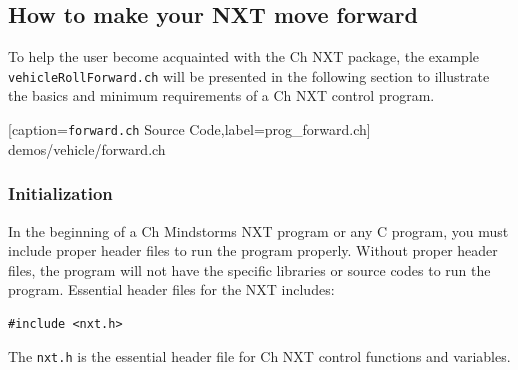 \documentclass[11pt]{article}
\begin{document}
\subsection{How to make your NXT move forward}
To help the user become acquainted with the Ch NXT package, the example 
{\tt vehicleRollForward.ch} will be presented in the following section to illustrate 
the basics and minimum requirements of a Ch NXT control program. 

[caption={{\tt forward.ch} Source Code},label=prog_forward.ch]
{demos/vehicle/forward.ch}

\subsubsection{Initialization}
In the beginning of a Ch Mindstorms NXT program or any C program, you must include 
proper header files to run the program properly. Without proper header files, the 
program will not have the specific libraries or source codes to run the program. 
Essential header files for the NXT includes:
\begin{lstlisting}
#include <nxt.h>
\end{lstlisting}
The {\tt nxt.h} is the essential header file for Ch NXT control functions and variables.  
\end{document}
